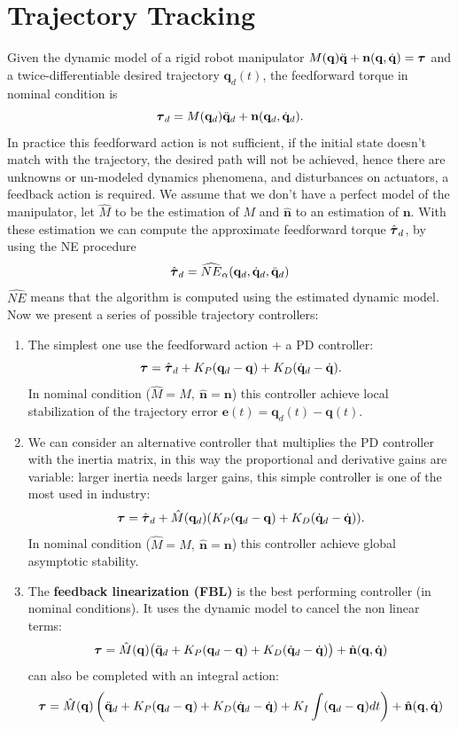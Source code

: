 \documentclass[10pt, a4paper]{report}
\newcommand{\q}{{\mathbf q}}
\begin{document}
\section{Trajectory Tracking}
Given the dynamic model of a rigid robot manipulator $M(\q)\ddq+\mathbf n(\q,\dq) = \btau$ and a twice-differentiable desired trajectory $\q_d(t)$, the feedforward torque in nominal condition is
$$ 
\btau_d=M(\q_d)\ddq_d+\mathbf n(\q_d,\dq_d).
$$
In practice this feedforward action is not sufficient, if the initial state doesn't match with the trajectory, the desired path will not be achieved, hence there are unknowns or un-modeled dynamics phenomena, and disturbances on actuators, a feedback action is required. We assume that we don't have a perfect model of the manipulator, let $\hat M$ to be the estimation of $M$ and $\hat{\mathbf n}$ to an estimation of $\mathbf n$. With these estimation we can compute the approximate feedforward torque $\hat{{\boldsymbol{\tau}}}_d$, by using the NE procedure\begin{equation}
    \hat\btau_d=\widehat{NE}_\alpha(\q_d,\dq_d,\ddq_d)
\end{equation} 
$\widehat{NE}$ means that the algorithm is computed using the estimated dynamic model. Now we present a series of possible trajectory controllers:\begin{enumerate}
    \item The simplest one use the feedforward action + a PD controller:\begin{equation}
        \btau=\hat\btau_d+K_P(\q_d-\q)+K_D(\dq_d-\dq).
    \end{equation}
     In nominal condition ($\hat M=M, \ \hat{\mathbf n}=\mathbf n $) this controller achieve local stabilization of the trajectory error $\mathbf e(t)=\q_d(t)-\q(t)$.
    \item We can consider an alternative controller that multiplies the PD controller with the inertia matrix, in this way the proportional and derivative gains are variable: larger inertia needs larger gains, this simple controller is one of the most used in industry:\begin{equation}
        \btau=\hat\btau_d+\hat M(\q_d)(K_P(\q_d-\q)+K_D(\dq_d-\dq)).
    \end{equation}
    In nominal condition ($\hat M=M, \ \hat{\mathbf n}=\mathbf n $) this controller achieve global asymptotic stability.
    \item The \textbf{feedback linearization (FBL)} is the best performing controller (in nominal conditions). It uses the dynamic model to cancel the non linear terms:\begin{equation}
        \btau=\hat M(\q)\big(\ddq_d+K_P(\q_d-\q)+K_D(\dq_d-\dq)\big)+\hat{\mathbf n}(\q,\dq)
    \end{equation}
    can also be completed with an integral action:
    \begin{equation}
        \btau=\hat M(\q)\left(\ddq_d+K_P(\q_d-\q)+K_D(\dq_d-\dq)+K_I\int(\q_d-\q)dt\right)+\hat{\mathbf n}(\q,\dq)
    \end{equation}
\end{enumerate}
\end{document}
